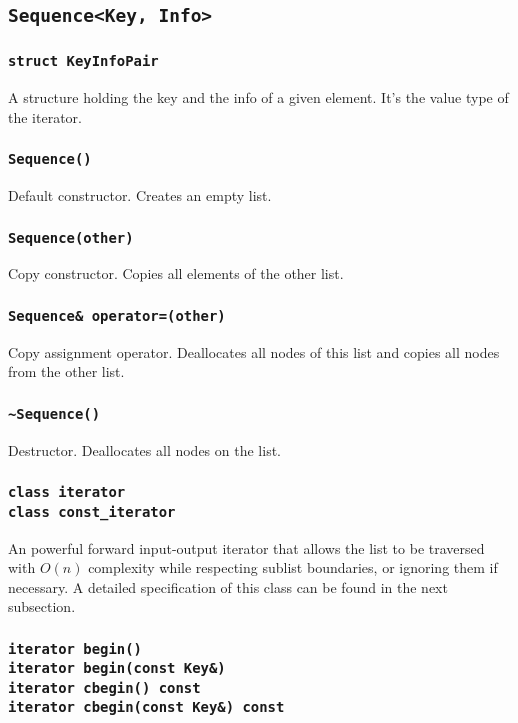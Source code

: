 ﻿\documentclass{article}
\begin{document}
\subsection{{\tt Sequence<Key, Info>}}

\subsubsection{{\tt struct KeyInfoPair}}

A structure holding the key and the info of a given element. It's the value type
of the iterator.

\subsubsection{{\tt Sequence()}}

Default constructor. Creates an empty list.

\subsubsection{{\tt Sequence(other)}}

Copy constructor. Copies all elements of the other list.

\subsubsection{{\tt Sequence\& operator=(other)}}

Copy assignment operator. Deallocates all nodes of this list and copies all
nodes from the other list.

\subsubsection{{\tt \~{}Sequence()}}

Destructor. Deallocates all nodes on the list.

\subsubsection{{\tt class iterator} \\
	{\tt class const\_iterator}}

An powerful forward input-output iterator that allows the list to be traversed
with $O(n)$ complexity while respecting sublist boundaries, or ignoring them
if necessary. A detailed specification of this class can be found in the next
subsection.

\subsubsection{{\tt iterator begin()} \\
	{\tt iterator begin(const Key\&)} \\
	{\tt iterator cbegin() const} \\
	{\tt iterator cbegin(const Key\&) const}}
	
\end{document}
